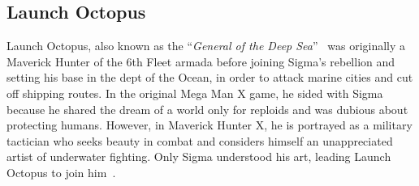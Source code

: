 \subsection{Launch Octopus}\label{boss:Launch_octopus}

Launch Octopus, also known as the ``\textit{General of the Deep Sea}''~\cite{book:MMX_Complete_art} was originally a Maverick Hunter of the 6th Fleet armada before joining Sigma's rebellion and setting his base in the dept of the Ocean, in order to attack marine cities and cut off shipping routes. In the original Mega Man X game, he sided with Sigma because he shared the dream of a world only for reploids and was dubious about protecting humans. However, in Maverick Hunter X, he is portrayed as a military tactician who seeks beauty in combat and considers himself an unappreciated artist of underwater fighting. Only Sigma understood his art, leading Launch Octopus to join him~\cite{wiki:MM_MHX_script}.
